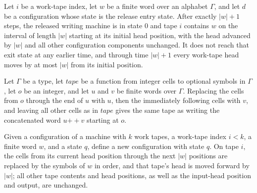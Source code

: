 \begin{theorem}
\label{Turing.rt_writeReleased_run}
\leanok
{}
Let $i$ be a work-tape index, let $w$ be a finite word over an alphabet $\Gamma$, and
let $d$ be a configuration whose state is the release entry state. After exactly $|w|+1$
steps, the released writing machine is in state $0$ and tape $i$ contains $w$ on the
interval of length $|w|$ starting at its initial head position, with the head advanced
by $|w|$ and all other configuration components unchanged. It does not reach that exit
state at any earlier time, and through time $|w|+1$ every work-tape head moves by at
most $|w|$ from its initial position.
\end{theorem}

\begin{theorem}
\label{Turing.rt_adjacentWrites}
\leanok
{}
Let $\Gamma$ be a type, let $tape$ be a function from integer cells to optional symbols
in $\Gamma$, let $o$ be an integer, and let $u$ and $v$ be finite words over $\Gamma$.
Replacing the cells from $o$ through the end of $u$ with $u$, then the immediately
following cells with $v$, and leaving all other cells as in $tape$ gives the same tape
as writing the concatenated word $u\mathbin{++}v$ starting at $o$.
\end{theorem}

\begin{definition}
\label{Turing.rt_advanceCfg}
\leanok
{}
Given a configuration of a machine with $k$ work tapes, a work-tape index $i<k$, a
finite word $w$, and a state $q$, define a new configuration with state $q$. On tape
$i$, the cells from its current head position through the next $|w|$ positions are
replaced by the symbols of $w$ in order, and that tape's head is moved forward by $|w|$;
all other tape contents and head positions, as well as the input-head position and
output, are unchanged.
\end{definition}

